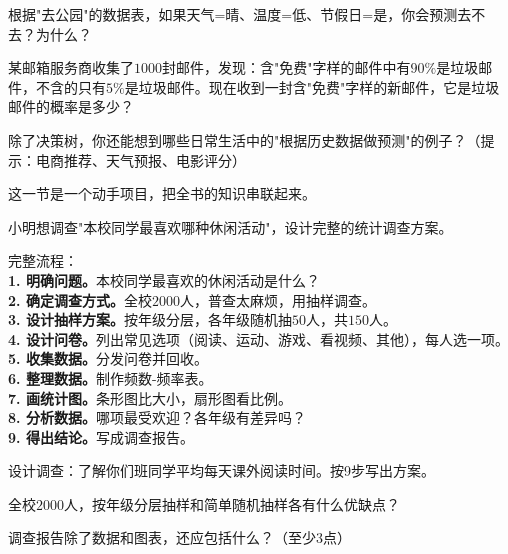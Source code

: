 \begin{exercise}
\item 根据"去公园"的数据表，如果天气=晴、温度=低、节假日=是，你会预测去不去？为什么？
\item 某邮箱服务商收集了$1000$封邮件，发现：含"免费"字样的邮件中有$90\%$是垃圾邮件，不含的只有$5\%$是垃圾邮件。现在收到一封含"免费"字样的新邮件，它是垃圾邮件的概率是多少？
\item 除了决策树，你还能想到哪些日常生活中的"根据历史数据做预测"的例子？（提示：电商推荐、天气预报、电影评分）
\end{exercise}


这一节是一个动手项目，把全书的知识串联起来。

\begin{example}
小明想调查"本校同学最喜欢哪种休闲活动"，设计完整的统计调查方案。
\end{example}
\begin{solution}
完整流程：\\
\textbf{1. 明确问题。}本校同学最喜欢的休闲活动是什么？\\
\textbf{2. 确定调查方式。}全校$2000$人，普查太麻烦，用抽样调查。\\
\textbf{3. 设计抽样方案。}按年级分层，各年级随机抽$50$人，共$150$人。\\
\textbf{4. 设计问卷。}列出常见选项（阅读、运动、游戏、看视频、其他），每人选一项。\\
\textbf{5. 收集数据。}分发问卷并回收。\\
\textbf{6. 整理数据。}制作频数-频率表。\\
\textbf{7. 画统计图。}条形图比大小，扇形图看比例。\\
\textbf{8. 分析数据。}哪项最受欢迎？各年级有差异吗？\\
\textbf{9. 得出结论。}写成调查报告。
\end{solution}


\begin{exercise}
\item 设计调查：了解你们班同学平均每天课外阅读时间。按9步写出方案。
\item 全校$2000$人，按年级分层抽样和简单随机抽样各有什么优缺点？
\item 调查报告除了数据和图表，还应包括什么？（至少3点）
\end{exercise}

